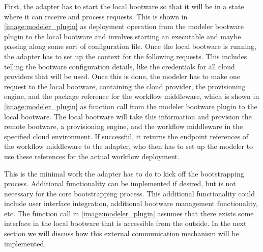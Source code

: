 First, the adapter has to start the local bootware so that it will be in a state where it can receive and process requests.
This is shown in \autoref{image:modeler_plugin} as deployment operation from the modeler bootware plugin to the local bootware and involves starting an executable and maybe passing along some sort of configuration file.
Once the local bootware is running, the adapter has to set up the context for the following requests.
This includes telling the bootware configuration details, like the credentials for all cloud providers that will be used.
Once this is done, the modeler has to make one request to the local bootware, containing the cloud provider, the provisioning engine, and the package reference for the workflow middleware, which is shown in \autoref{image:modeler_plugin} as function call from the modeler bootware plugin to the local bootware.
The local bootware will take this information and provision the remote bootware, a provisioning engine, and the workflow middleware in the specified cloud environment.
If successful, it returns the endpoint references of the workflow middleware to the adapter, who then has to set up the modeler to use these references for the actual workflow deployment.

This is the minimal work the adapter has to do to kick off the bootstrapping process.
Additional functionality can be implemented if desired, but is not necessary for the core bootstrapping process.
This additional functionality could include user interface integration, additional bootware management functionality, etc.
The function call in \autoref{image:modeler_plugin} assumes that there exists some interface in the local bootware that is accessible from the outside.
In the next section we will discuss how this external communication mechanism will be implemented.

